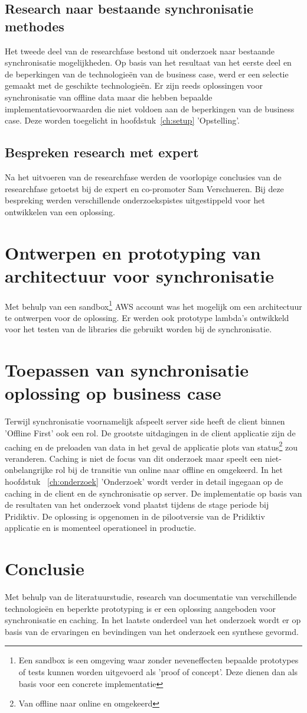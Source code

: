 \subsection{Research naar bestaande synchronisatie methodes}
Het tweede deel van de researchfase bestond uit onderzoek naar bestaande synchronisatie mogelijkheden. Op basis van het resultaat van het eerste deel en de beperkingen van de technologie\"en van de business case, werd er een selectie gemaakt met de geschikte technologie\"en. Er zijn reeds oplossingen voor synchronisatie van offline data maar die hebben bepaalde implementatievoorwaarden die niet voldoen aan de beperkingen van de business case. Deze worden toegelicht in hoofdstuk~\ref{ch:setup} 'Opstelling'.
\subsection{Bespreken research met expert}
Na het uitvoeren van de researchfase werden de voorlopige conclusies van de researchfase getoetst bij de expert en co-promoter Sam Verschueren. Bij deze bespreking werden verschillende onderzoekspistes uitgestippeld voor het ontwikkelen van een oplossing.
\section{Ontwerpen en prototyping van architectuur voor synchronisatie}
Met behulp van een sandbox\footnote{Een sandbox is een omgeving waar zonder neveneffecten bepaalde prototypes of tests kunnen worden uitgevoerd als 'proof of concept'. Deze dienen dan als basis voor een concrete implementatie} AWS account was het mogelijk om een architectuur te ontwerpen voor de oplossing. Er werden ook prototype lambda's ontwikkeld voor het testen van de libraries die gebruikt worden bij de synchronisatie.
\clearpage
\section{Toepassen van synchronisatie oplossing op business case}
Terwijl synchronisatie voornamelijk afspeelt server side heeft de client binnen 'Offline First' ook een rol. De grootste uitdagingen in de client applicatie zijn de caching en de preloaden van data in het geval de applicatie plots van status\footnote{Van offline naar online en omgekeerd} zou veranderen. Caching is niet de focus van dit onderzoek maar speelt een niet-onbelangrijke rol bij de transitie van online naar offline en omgekeerd. In het hoofdstuk ~\ref{ch:onderzoek} 'Onderzoek' wordt verder in detail ingegaan op de caching in de client en de synchronisatie op server. De implementatie op basis van de resultaten van het onderzoek vond plaatst tijdens de stage periode bij Pridiktiv. De oplossing is opgenomen in de pilootversie van de Pridiktiv applicatie en is momenteel operationeel in productie.
\section{Conclusie}
Met behulp van de literatuurstudie, research van documentatie van verschillende technologie\"en en beperkte prototyping is er een oplossing aangeboden voor synchronisatie en caching. In het laatste onderdeel van het onderzoek wordt er op basis van de ervaringen en bevindingen van het onderzoek een synthese gevormd.